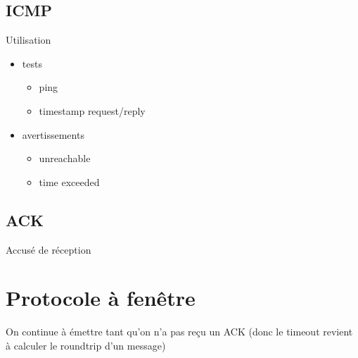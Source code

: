 \documentclass{article}
\begin{document}
\subsection{ICMP}
Utilisation
\begin{itemize}
    \item tests
        \begin{itemize}
    \item ping
    \item timestamp request/reply
        \end{itemize}
    \item avertissements
        \begin{itemize}
            \item unreachable
            \item time exceeded
        \end{itemize}
\end{itemize}

\subsection{ACK}
Accusé de réception


\section{Protocole à fenêtre}

On continue à émettre tant qu'on n'a pas reçu un ACK (donc le timeout revient à calculer le roundtrip d'un message)
\end{document}
